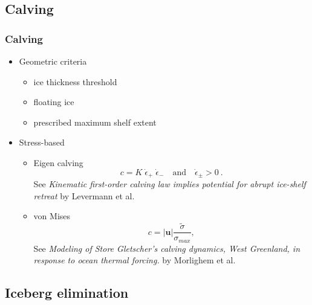 \documentclass[hide notes,intlimits]{beamer}
\begin{document}
\subsection{Calving}
\label{sec:calving}

\begin{frame}
  \frametitle{Calving}

  \begin{itemize}
  \item Geometric criteria
    \begin{itemize}
    \item ice thickness threshold
    \item floating ice
    \item prescribed maximum shelf extent
    \end{itemize}
  \item Stress-based
    \begin{itemize}
    \item Eigen calving
      \begin{equation}
        \label{eq:7}
        c = K\; \dot{\epsilon}_{+}\; \dot{\epsilon}_{-}\quad\text{and}\quad\dot{\epsilon}_{\pm}>0\:.
      \end{equation}
      See \emph{Kinematic first-order calving law implies
      potential for abrupt ice-shelf retreat} by Levermann et al.
    \item von Mises
      \begin{equation}
        \label{eq:8}
        c = |\mathbf{u}| \frac{\tilde{\sigma}}{\sigma_{max}},
      \end{equation}
      See \emph{Modeling of Store Gletscher’s calving dynamics, West
        Greenland, in response to ocean thermal forcing.} by Morlighem
      et al.
    \end{itemize}
  \end{itemize}
\end{frame}


\subsection{Iceberg elimination}
\label{sec:iceberg-elimination}
\end{document}
